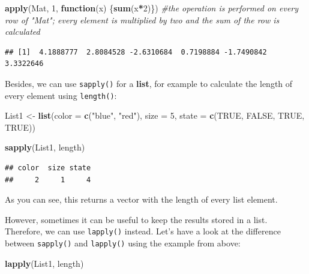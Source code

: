 \documentclass[
]{book}
\newenvironment{Shaded}{\begin{snugshade}}{\end{snugshade}}
\newcommand{\AttributeTok}[1]{\textcolor[rgb]{0.13,0.29,0.53}{#1}}
\newcommand{\CommentTok}[1]{\textcolor[rgb]{0.56,0.35,0.01}{\textit{#1}}}
\newcommand{\ConstantTok}[1]{\textcolor[rgb]{0.56,0.35,0.01}{#1}}
\newcommand{\ControlFlowTok}[1]{\textcolor[rgb]{0.13,0.29,0.53}{\textbf{#1}}}
\newcommand{\DecValTok}[1]{\textcolor[rgb]{0.00,0.00,0.81}{#1}}
\newcommand{\FunctionTok}[1]{\textcolor[rgb]{0.13,0.29,0.53}{\textbf{#1}}}
\newcommand{\NormalTok}[1]{#1}
\newcommand{\OtherTok}[1]{\textcolor[rgb]{0.56,0.35,0.01}{#1}}
\newcommand{\SpecialCharTok}[1]{\textcolor[rgb]{0.81,0.36,0.00}{\textbf{#1}}}
\newcommand{\StringTok}[1]{\textcolor[rgb]{0.31,0.60,0.02}{#1}}
\begin{document}
\begin{Shaded}
\begin{Highlighting}[]
\FunctionTok{apply}\NormalTok{(Mat, }\DecValTok{1}\NormalTok{, }\ControlFlowTok{function}\NormalTok{(x) \{}\FunctionTok{sum}\NormalTok{(x}\SpecialCharTok{*}\DecValTok{2}\NormalTok{)\}) }\CommentTok{\#the operation is performed on every row of "Mat"; every element is multiplied by two and the sum of the row is calculated}
\end{Highlighting}
\end{Shaded}

\begin{verbatim}
## [1]  4.1888777  2.8084528 -2.6310684  0.7198884 -1.7490842  3.3322646
\end{verbatim}

Besides, we can use \texttt{sapply()} for a \textbf{list}, for example to calculate the length of every element using \texttt{length()}:

\begin{Shaded}
\begin{Highlighting}[]
\NormalTok{List1 }\OtherTok{\textless{}{-}} \FunctionTok{list}\NormalTok{(}\AttributeTok{color =} \FunctionTok{c}\NormalTok{(}\StringTok{"blue"}\NormalTok{, }\StringTok{"red"}\NormalTok{), }\AttributeTok{size =} \DecValTok{5}\NormalTok{, }\AttributeTok{state =} \FunctionTok{c}\NormalTok{(}\ConstantTok{TRUE}\NormalTok{, }\ConstantTok{FALSE}\NormalTok{, }\ConstantTok{TRUE}\NormalTok{, }\ConstantTok{TRUE}\NormalTok{))}

\FunctionTok{sapply}\NormalTok{(List1, length)}
\end{Highlighting}
\end{Shaded}

\begin{verbatim}
## color  size state 
##     2     1     4
\end{verbatim}

As you can see, this returns a vector with the length of every list element.

However, sometimes it can be useful to keep the results stored in a list.
Therefore, we can use \texttt{lapply()} instead.
Let's have a look at the difference between \texttt{sapply()} and \texttt{lapply()} using the example from above:

\begin{Shaded}
\begin{Highlighting}[]
\FunctionTok{lapply}\NormalTok{(List1, length)}
\end{Highlighting}
\end{Shaded}
\end{document}
